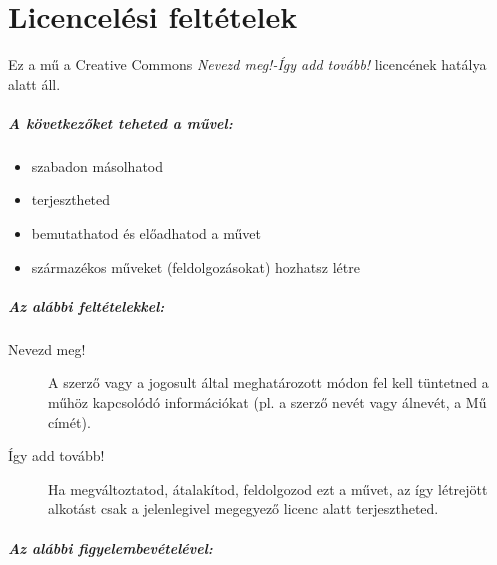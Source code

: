 \documentclass[a4paper, titlepage]{report}
\begin{document}
\appendix

\chapter{Licencelési feltételek}

Ez a mű a Creative Commons \textit{Nevezd meg!-Így add tovább!} licencének hatálya alatt áll.

\paragraph{A következőket teheted a művel:}

\begin{itemize}
 \item szabadon másolhatod
 \item terjesztheted
 \item bemutathatod és előadhatod a művet 
 \item származékos műveket (feldolgozásokat) hozhatsz létre
\end{itemize}

\paragraph{Az alábbi feltételekkel:}

\begin{description}
 \item[Nevezd meg!] A szerző vagy a jogosult által meghatározott módon fel kell tüntetned a műhöz kapcsolódó információkat (pl. a szerző nevét vagy álnevét, a Mű címét).
 \item[Így add tovább!] Ha megváltoztatod, átalakítod, feldolgozod ezt a művet, az így létrejött alkotást csak a jelenlegivel megegyező licenc alatt terjesztheted.
\end{description}

\paragraph{Az alábbi figyelembevételével:}
\end{document}
